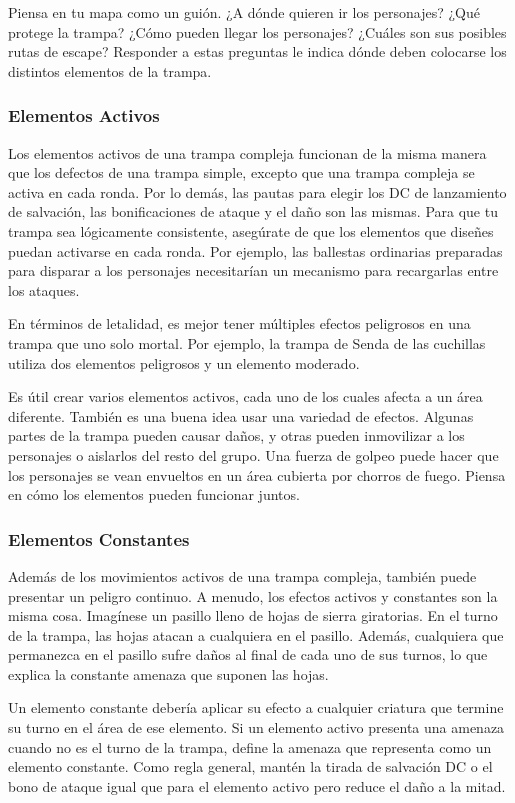 \documentclass[a4paper,twocolumn,openany,10pt]{dndbook}
\begin{document}
Piensa en tu mapa como un guión. ¿A dónde quieren ir los personajes? ¿Qué protege la trampa? ¿Cómo pueden llegar los personajes?
¿Cuáles son sus posibles rutas de escape? Responder a estas preguntas le indica dónde deben colocarse los distintos elementos de
la trampa. 

\subsubsection*{Elementos Activos}
Los elementos activos de una trampa compleja funcionan de la misma manera que los defectos de una trampa simple, excepto que una
trampa compleja se activa en cada ronda. Por lo demás, las pautas para elegir los DC de lanzamiento de salvación, las
bonificaciones de ataque y el daño son las mismas. Para que tu trampa sea lógicamente consistente, asegúrate de que los elementos
que diseñes puedan activarse en cada ronda. Por ejemplo, las ballestas ordinarias preparadas para disparar a los personajes
necesitarían un mecanismo para recargarlas entre los ataques.

En términos de letalidad, es mejor tener múltiples efectos peligrosos en una trampa que uno solo mortal. Por ejemplo, la trampa
de Senda de las cuchillas utiliza dos elementos peligrosos y un elemento moderado.

Es útil crear varios elementos activos, cada uno de los cuales afecta a un área diferente. También es una buena idea usar una
variedad de efectos. Algunas partes de la trampa pueden causar daños, y otras pueden inmovilizar a los personajes o aislarlos del
resto del grupo. Una fuerza de golpeo puede hacer que los personajes se vean envueltos en un área cubierta por chorros de fuego.
Piensa en cómo los elementos pueden funcionar juntos. 

\subsubsection*{Elementos Constantes}
Además de los movimientos activos de una trampa compleja, también puede presentar un peligro continuo. A menudo, los efectos
activos y constantes son la misma cosa. Imagínese un pasillo lleno de hojas de sierra giratorias. En el turno de la trampa, las
hojas atacan a cualquiera en el pasillo. Además, cualquiera que permanezca en el pasillo sufre daños al final de cada uno de sus
turnos, lo que explica la constante amenaza que suponen las hojas.

Un elemento constante debería aplicar su efecto a cualquier criatura que termine su turno en el área de ese elemento. Si un
elemento activo presenta una amenaza cuando no es el turno de la trampa, define la amenaza que representa como un elemento
constante. Como regla general, mantén la tirada de salvación DC o el bono de ataque igual que para el elemento activo pero reduce
el daño a la mitad.
\end{document}
